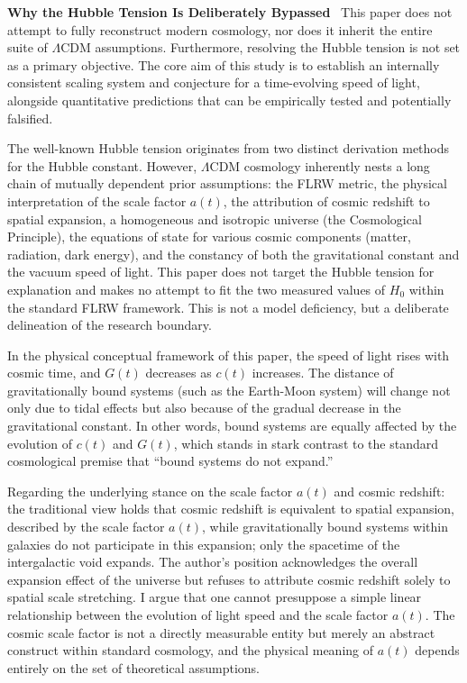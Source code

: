 \documentclass[12pt,leqno]{article}
\begin{document}
{	
	\medskip
	\bigskip
	\textbf{Why the Hubble Tension Is Deliberately Bypassed}\,\,\,
	This paper does not attempt to fully reconstruct modern cosmology, nor does it inherit the entire suite of $\Lambda$CDM assumptions. Furthermore, resolving the Hubble tension is not set as a primary objective. The core aim of this study is to establish an internally consistent scaling system and conjecture for a time-evolving speed of light, alongside quantitative predictions that can be empirically tested and potentially falsified.
	
	\medskip
	The well-known Hubble tension originates from two distinct derivation methods for the Hubble constant. However, $\Lambda$CDM cosmology inherently nests a long chain of mutually dependent prior assumptions: the FLRW metric, the physical interpretation of the scale factor $a(t)$, the attribution of cosmic redshift to spatial expansion, a homogeneous and isotropic universe (the Cosmological Principle), the equations of state for various cosmic components (matter, radiation, dark energy), and the constancy of both the gravitational constant and the vacuum speed of light. This paper does not target the Hubble tension for explanation and makes no attempt to fit the two measured values of $H_0$ within the standard FLRW framework. This is not a model deficiency, but a deliberate delineation of the research boundary.
	
	\medskip
	In the physical conceptual framework of this paper, the speed of light rises with cosmic time, and $G(t)$ decreases as $c(t)$ increases. The distance of gravitationally bound systems (such as the Earth-Moon system) will change not only due to tidal effects but also because of the gradual decrease in the gravitational constant. In other words, bound systems are equally affected by the evolution of $c(t)$ and $G(t)$, which stands in stark contrast to the standard cosmological premise that ``bound systems do not expand.''
	
	\medskip
	Regarding the underlying stance on the scale factor $a(t)$ and cosmic redshift: the traditional view holds that cosmic redshift is equivalent to spatial expansion, described by the scale factor $a(t)$, while gravitationally bound systems within galaxies do not participate in this expansion; only the spacetime of the intergalactic void expands. The author's position acknowledges the overall expansion effect of the universe but refuses to attribute cosmic redshift solely to spatial scale stretching. I argue that one cannot presuppose a simple linear relationship between the evolution of light speed and the scale factor $a(t)$. The cosmic scale factor is not a directly measurable entity but merely an abstract construct within standard cosmology, and the physical meaning of $a(t)$ depends entirely on the set of theoretical assumptions.
	
}
\end{document}
